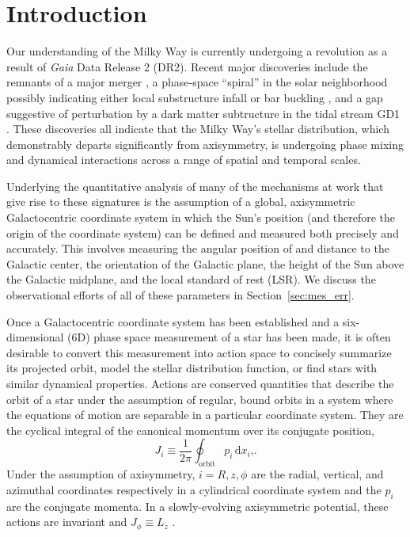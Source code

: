 \documentclass[twocolumn]{aastex62}
\newcommand{\beq}{\begin{equation}}
\newcommand{\eeq}{\end{equation}}
\begin{document}

\section{Introduction} \label{sec:intro}
Our understanding of the Milky Way is currently undergoing a revolution as a
result of {\em Gaia} Data Release 2 (DR2).  Recent major discoveries include
the remnants of a major merger \citep{2018ApJ...860L..11K,
2018Natur.563...85H, 2018arXiv180704290L, 2019MNRAS.482.3426M}, a phase-space
``spiral'' in the solar neighborhood \citep{2018Natur.561..360A} possibly
indicating either local substructure infall \citep{2018MNRAS.481.1501B,
2018arXiv180800451L} or bar buckling \citep{2018arXiv181109205K}, and a gap
suggestive of perturbation by a dark matter subtructure in the tidal stream
GD1 \citep{2018ApJ...863L..20P, 2018arXiv181103631B}. These discoveries all
indicate that the Milky Way's stellar distribution, which demonstrably departs
significantly from axisymmetry, is undergoing phase mixing and dynamical
interactions across a range of spatial and temporal scales.

Underlying the quantitative analysis of many of the mechanisms at work that
give rise to these signatures is the assumption of a global, axisymmetric
Galactocentric coordinate system \citep{2008gady.book.....B} in which the
Sun's position (and therefore the origin of the coordinate system) can be
defined and measured both precisely and accurately. This involves measuring
the angular position of and distance to the Galactic center, the orientation
of the Galactic plane, the height of the Sun above the Galactic midplane, and
the local standard of rest (LSR). We discuss the observational efforts of all
of these parameters in Section~\ref{sec:mes_err}.

Once a Galactocentric coordinate system has been established and a
six-dimensional (6D) phase space measurement of a star has been made, it is
often desirable to convert this measurement into action space to concisely
summarize its projected orbit, model the stellar distribution function, or
find stars with similar dynamical properties. Actions are conserved quantities
that describe the orbit of a star under the assumption of regular, bound
orbits in a system where the equations of motion are separable in a particular
coordinate system. They are the cyclical integral of the canonical momentum
over its conjugate position,
\beq\label{eq:actions}
J_i \equiv
\frac{1}{2\pi} \oint_{\text{orbit}}p_i\,\text{d}x_i\text{,.}
\eeq
Under the assumption of axisymmetry, $i=R,z,\phi$ are the radial, vertical,
and azimuthal coordinates respectively in a cylindrical coordinate system and
the $p_i$ are the conjugate momenta. In a slowly-evolving axisymmetric potential, these
actions are invariant and $J_{\phi} \equiv L_z$
\citep{2008gady.book.....B,2014RvMP...86....1S}.
\end{document}
